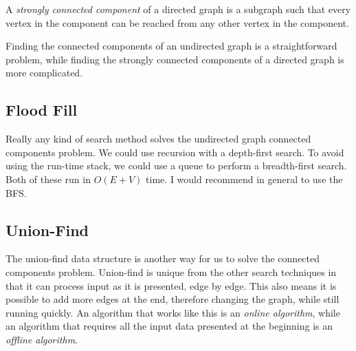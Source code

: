 \documentclass[11pt]{book}
\begin{document}
A \textit{strongly connected component} of a directed graph is a subgraph such that every vertex in the component can be reached from any other vertex in the component.

\begin{center}
\end{center}

Finding the connected components of an undirected graph is a straightforward problem, while finding the strongly connected components of a directed graph is more complicated.

\subsection{Flood Fill}

Really any kind of search method solves the undirected graph connected components problem. We could use recursion with a depth-first search. To avoid using the run-time stack, we could use a queue to perform a breadth-first search. Both of these run in $O(E+V)$ time. I would recommend in general to use the BFS.

\subsection{Union-Find}

The union-find data structure is another way for us to solve the connected components problem. Union-find is unique from the other search techniques in that it can process input as it is presented, edge by edge. This also means it is possible to add more edges at the end, therefore changing the graph, while still running quickly. An algorithm that works like this is an \textit{online algorithm}, while an algorithm that requires all the input data presented at the beginning is an \textit{offline algorithm}.
\end{document}
